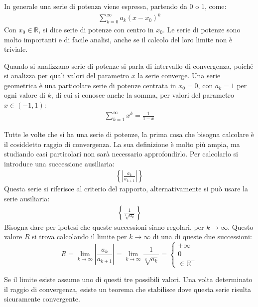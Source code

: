 \documentclass{article}
\numberwithin{equation}{subsection}
\begin{document}
In generale una serie di potenza viene espressa, partendo da 0 o 1, come:
\begin{gather*}
    \displaystyle\sum_{k=0}^\infty a_k(x-x_0)^k
\end{gather*}
Con $x_0\in\mathbb{R}$, si dice serie di potenze con centro in $x_0$. Le serie di potenze sono molto importanti e di facile analisi, anche se il calcolo del loro limite non è triviale. 

Quando si analizzano serie di potenze si parla di intervallo di convergenza, poiché si analizza per quali valori del parametro $x$ la serie converge. Una serie geometrica è una particolare serie di potenze centrata in $x_0=0$, con $a_k=1$ per ogni valore di $k$, di cui si conosce anche la somma, per valori del parametro $x\in(-1,1)$:
\begin{gather*}
    \displaystyle\sum_{k=1}^\infty x^k=\frac{1}{1-x}
\end{gather*}

Tutte le volte che si ha una serie di potenze, la prima cosa che bisogna calcolare è il cosiddetto raggio di convergenza. La sua definizione è molto più ampia, ma studiando casi particolari non sarà necessario approfondirlo. Per calcolarlo si introduce una successione ausiliaria:
\begin{gather*}
    \left\{\displaystyle\left|\frac{a_k}{a_{k+1}}\right|\right\}
\end{gather*}
Questa serie si riferisce al criterio del rapporto, alternativamente si può usare la serie ausiliaria: %
\begin{gather*}
    \left\{\displaystyle\frac{1}{\sqrt[k]{a_k}}\right\}
\end{gather*}
Bisogna dare per ipotesi che queste successioni siano regolari, per $k\to\infty$. Questo valore $R$ si trova calcolando il limite per $k\to\infty$ di una di queste due successioni:
\begin{equation}
    R=\lim_{k\to\infty}\displaystyle\left|\frac{a_k}{a_{k+1}}\right|=\lim_{k\to\infty}\frac{1}{\sqrt[k]{a_k}}=\begin{cases}
        +\infty\\
        0\\
        \in\mathbb{R}^+
    \end{cases}
\end{equation}

Se il limite esiste assume uno di questi tre possibili valori. Una volta determinato il raggio di convergenza, esiste un teorema che stabilisce dove questa serie risulta sicuramente convergente. 
\end{document}
